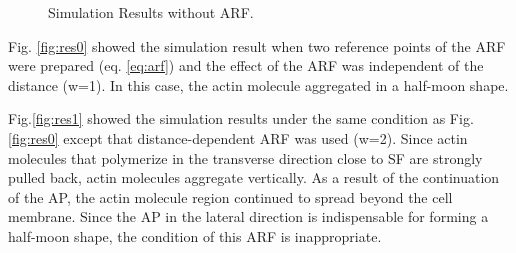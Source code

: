\documentclass[a4paper,12pt, oneside]{book}
\begin{document}
\begin{figure}[tbp]
 \caption{Simulation Results without ARF.}
 \label{fig:res3}
\end{figure}
Fig. \ref{fig:res0} showed the simulation result when two reference points of the ARF were prepared (eq. \ref{eq:arf}) and the effect of the ARF was independent of the distance (w=1).
In this case, the actin molecule aggregated in a half-moon shape.

Fig.\ref{fig:res1} showed the simulation results under the same condition as Fig. \ref{fig:res0} except that distance-dependent ARF was  used (w=2).
Since actin molecules that polymerize in the transverse direction close to SF are strongly pulled back, actin molecules aggregate vertically.
As a result of the continuation of the AP, the actin molecule region continued to spread beyond the cell membrane.
Since the AP in the lateral direction is indispensable for forming a half-moon shape, the condition of this ARF is inappropriate.
\end{document}
